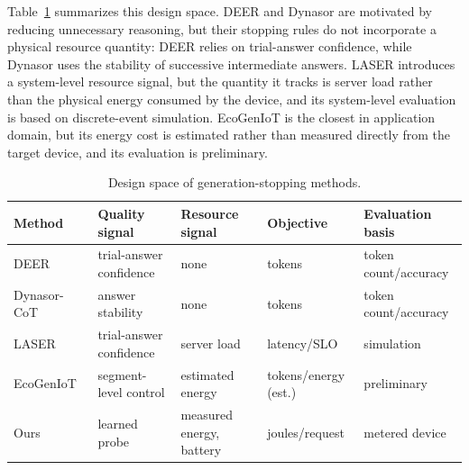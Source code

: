 \documentclass[review,12pt]{elsarticle}
\begin{document}
Table~\ref{tab:taxonomy} summarizes this design space. DEER and Dynasor are
motivated by reducing unnecessary reasoning, but their stopping rules do not
incorporate a physical resource quantity: DEER relies on trial-answer
confidence, while Dynasor uses the stability of successive intermediate
answers. LASER introduces a system-level resource signal, but the quantity it
tracks is server load rather than the physical energy consumed by the device,
and its system-level evaluation is based on discrete-event simulation.
EcoGenIoT is the closest in application domain, but its energy cost is
estimated rather than measured directly from the target device, and its
evaluation is preliminary.

\begin{table}[t]
\centering
\small
\setlength{\tabcolsep}{2pt}
\caption{Design space of generation-stopping methods.}
\label{tab:taxonomy}
\begin{tabular}{@{}
  >{\raggedright\arraybackslash}p{2.7cm}
  >{\raggedright\arraybackslash}p{2.8cm}
  >{\raggedright\arraybackslash}p{2.6cm}
  >{\raggedright\arraybackslash}p{2.5cm}
  >{\raggedright\arraybackslash}p{2.0cm}@{}}
\toprule
Method & Quality signal & Resource signal & Objective & Evaluation basis \\
\midrule
DEER~\cite{yang2025deer}
& trial-answer confidence
& none
& tokens
& token count/accuracy \\

Dynasor-CoT~\cite{fu2025dynasor}
& answer stability
& none
& tokens
& token count/accuracy  \\

LASER~\cite{tang2026laser}
& trial-answer confidence
& server load
& latency\slash SLO
& simulation \\

EcoGenIoT~\cite{yu2026ecogeniot}
& segment-level control
& estimated energy
& tokens\slash energy (est.)
& preliminary \\

Ours
& learned probe
& measured energy, battery
& joules\slash request
& metered device \\
\bottomrule
\end{tabular}
\end{table}
\end{document}
